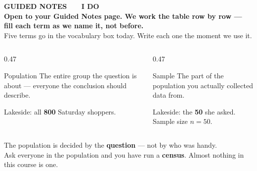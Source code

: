 \documentclass[aspectratio=169, 11pt]{beamer}
\newcommand{\redink}[1]{{\color{redacc}\bfseries #1}}
\begin{document}
{
\begin{frame}[plain]
  \vspace{1.8cm}\hspace{0.8cm}%
  \begin{minipage}{0.86\textwidth}
    {\color{goldacc}\bfseries\small GUIDED NOTES \ \textbullet\ \ I DO}\\[0.7cm]
    {\color{white}\bfseries\Large Open to your Guided Notes page. We work the table row by
    row --- fill each term as we name it, not before.}\\[0.9cm]
    {\color{frostmid}\small Five terms go in the vocabulary box today. Write each one the
    moment we use it.}
  \end{minipage}
\end{frame}
}

\begin{frame}[t, plain]
  \vspace{4pt}
  \begin{columns}[t]
    \begin{column}{0.47\textwidth}
      \begin{block}{Population}
        The entire group the question is about --- everyone the conclusion should describe.
      \end{block}
      \vspace{4pt}
      {\small Lakeside: all \textbf{800} Saturday shoppers.}
    \end{column}
    \begin{column}{0.47\textwidth}
      \begin{block}{Sample}
        The part of the population you actually collected data from.
      \end{block}
      \vspace{4pt}
      {\small Lakeside: the \textbf{50} she asked. Sample size $n = 50$.}
    \end{column}
  \end{columns}
  \vspace{12pt}
  \begin{center}
    {\large The population is decided by the \redink{question} --- not by who was handy.}\\[6pt]
    {\small\color{slate} Ask everyone in the population and you have run a \textbf{census}.
    Almost nothing in this course is one.}
  \end{center}
\end{frame}
\end{document}
